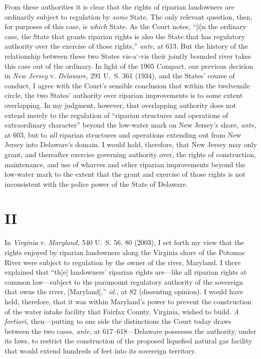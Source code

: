   From these authorities it is clear that the rights of riparian
landowners are ordinarily subject to regulation by \emph{some} State. The
only relevant question, then, for purposes of this case, is \emph{which}
State. As the Court notes, ``[i]n the ordinary case, the State that
grants riparian rights is also the State that has regulatory authority
over the exercise of those rights,'' \emph{ante,} at 613. But the
history of the relationship between these two States vis-a`-vis their
jointly bounded river takes this case out of the ordinary. In light
of the 1905 Compact, our previous decision in \emph{New Jersey} v.
\emph{Delaware,} 291 U.~S. 361 (1934), and the States' course of
conduct, I agree with the Court's sensible conclusion that within
the twelvemile circle, the two States' authority over riparian
improvements is to some extent overlapping. In my judgment, however,
that overlapping authority does not extend merely to the regulation of
``riparian structures and operations of extraordinary character''
beyond the low-water mark on New Jersey's shore, \emph{ante,} at 603,
but to \emph{all} riparian structures and operations extending out from
New Jersey into Delaware's domain. I would hold, therefore, that New
Jersey may only grant, and thereafter exercise governing authority over,
the rights of construction, maintenance, and use of wharves and other
riparian improvements beyond the low-water mark to the extent that the
grant and exercise of those rights is not inconsistent with the police
power of the State of Delaware.

\section{II}

  In \emph{Virginia} v. \emph{Maryland,} 540 U.~S. 56, 80 (2003), I set
forth my view that the rights enjoyed by riparian landowners along
the Virginia shore of the Potomac River were subject to regulation
by the owner of the river, Maryland. I there explained that ``th[e]
landowners' riparian rights are---like all riparian rights at common
law---subject to the paramount regulatory authority of the sovereign
that owns the river, [Maryland],'' \emph{id.,} at 82 (dissenting
opinion). I would have \newpage  held, therefore, that it was within
Maryland's power to prevent the construction of the water intake
facility that Fairfax County, Virginia, wished to build. \emph{A fortiori,}
then---putting to one side the distinctions the Court today draws
between the two cases, \emph{ante,} at 617--618---Delaware possesses
the authority, under its laws, to restrict the construction of the
proposed liquefied natural gas facility that would extend hundreds of
feet into its sovereign territory.

